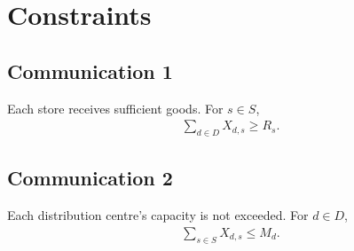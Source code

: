 \documentclass[11pt,a4paper]{article}
\begin{document}
\section{Constraints}
\subsection{Communication 1}
Each store receives sufficient goods. For $s \in S$,
\begin{align*}
    \sum_{d \in D} X_{d,s} \ge R_s.
\end{align*}

\subsection{Communication 2}
Each distribution centre's capacity is not exceeded. For $d \in D$,
\begin{align*}
    \sum_{s \in S} X_{d,s} \le M_d.
\end{align*}
\end{document}
